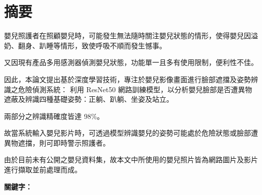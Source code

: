 \documentclass[class=NCU_thesis, crop=false]{standalone}
\begin{document}
\chapter{摘要}
嬰兒照護者在照顧嬰兒時，可能發生無法隨時關注嬰兒狀態的情形，使得嬰兒因溢奶、翻身、趴睡等情形，致使呼吸不順而發生憾事。

又因現有產品多用感測器偵測嬰兒狀態，功能單一且多有使用限制，便利性不佳。

因此，本論文提出基於深度學習技術，專注於嬰兒影像畫面進行臉部遮擋及姿勢辨識之危險偵測系統：
利用 ResNet50 網路訓練模型，以分析嬰兒臉部是否遭異物遮蔽及辨識四種基礎姿勢：正躺、趴躺、坐姿及站立。

兩部分之辨識精確度皆達 98\%。

故當系統輸入嬰兒影片時，可透過模型辨識嬰兒的姿勢可能處於危險狀態或臉部遭異物遮擋，則可即時警示照護者。

由於目前未有公開之嬰兒資料集，故本文中所使用的嬰兒照片皆為網路圖片及影片進行擷取並前處理而成。


\vspace{2em}
\noindent \textbf{關鍵字：} \keywordsZh{} %
\end{document}
